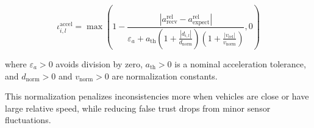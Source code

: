 \documentclass{ifacconf}
\begin{document}
\begin{equation*}
    \iota_{i,l}^{\text{accel}} =
    \max\left(
    1 -
    \frac{|a_{\text{recv}}^{\text{rel}} - a_{\text{expect}}^{\text{rel}}|}
    {\varepsilon_a+a_{\text{th}}\left(1 + \frac{|d_{i,l}|}{d_{\text{norm}}}\right)\left(1 + \frac{|v_{\text{rel}}|}{v_{\text{norm}}}\right)},
    0
    \right)
\end{equation*}

where $\varepsilon_a>0$ avoids division by zero, $a_{\text{th}}>0$ is a nominal acceleration tolerance, and $d_{\text{norm}}>0$ and $v_{\text{norm}}>0$ are normalization constants.

This normalization penalizes inconsistencies more when vehicles are close or have large relative speed, while reducing false trust drops from minor sensor fluctuations.

\end{document}
